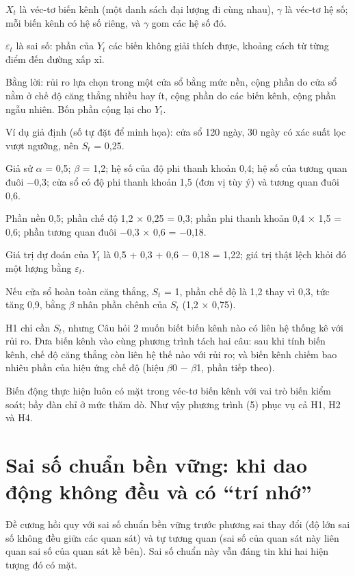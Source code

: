 \(X_{t}\) là véc-tơ biến kênh (một danh sách đại lượng đi cùng nhau), \(\gamma\) là véc-tơ hệ số; mỗi biến kênh có hệ số riêng, và \(\gamma\) gom các hệ số đó.

\(\varepsilon_{t}\) là sai số: phần của \(Y_{t}\) các biến không giải thích được, khoảng cách từ từng điểm đến đường xấp xỉ.

Bằng lời: rủi ro lựa chọn trong một cửa sổ bằng mức nền, cộng phần do cửa sổ nằm ở chế độ căng thẳng nhiều hay ít, cộng phần do các biến kênh, cộng phần ngẫu nhiên. Bốn phần cộng lại cho \(Y_{t}\).

\begin{tcolorbox}[breakable]
Ví dụ giả định (số tự đặt để minh họa): cửa sổ 120 ngày, 30 ngày có xác suất lọc vượt ngưỡng, nên \(S_{t}\) = 0,25.

Giả sử \(\alpha\) = 0,5; \(\beta\) = 1,2; hệ số của độ phi thanh khoản 0,4; hệ số của tương quan đuôi −0,3; cửa sổ có độ phi thanh khoản 1,5 (đơn vị tùy ý) và tương quan đuôi 0,6.

Phần nền 0,5; phần chế độ 1,2 × 0,25 = 0,3; phần phi thanh khoản 0,4 × 1,5 = 0,6; phần tương quan đuôi −0,3 × 0,6 = −0,18.

Giá trị dự đoán của \(Y_{t}\) là 0,5 + 0,3 + 0,6 − 0,18 = 1,22; giá trị thật lệch khỏi đó một lượng bằng \(\varepsilon_{t}\).

Nếu cửa sổ hoàn toàn căng thẳng, \(S_{t}\) = 1, phần chế độ là 1,2 thay vì 0,3, tức tăng 0,9, bằng \(\beta\) nhân phần chênh của \(S_{t}\) (1,2 × 0,75).
\end{tcolorbox}

H1 chỉ cần \(S_{t}\), nhưng Câu hỏi 2 muốn biết biến kênh nào có liên hệ thống kê với rủi ro. Đưa biến kênh vào cùng phương trình tách hai câu: sau khi tính biến kênh, chế độ căng thẳng còn liên hệ thế nào với rủi ro; và biến kênh chiếm bao nhiêu phần của hiệu ứng chế độ (hiệu \texorpdfstring{$\beta$}{beta}0 − \texorpdfstring{$\beta$}{beta}1, phần tiếp theo).

Biến động thực hiện luôn có mặt trong véc-tơ biến kênh với vai trò biến kiểm soát; bầy đàn chỉ ở mức thăm dò. Như vậy phương trình (5) phục vụ cả H1, H2 và H4.

\section{Sai số chuẩn bền vững: khi dao động không đều và có “trí nhớ”}

Đề cương hồi quy với sai số chuẩn bền vững trước phương sai thay đổi (độ lớn sai số không đều giữa các quan sát) và tự tương quan (sai số của quan sát này liên quan sai số của quan sát kề bên). Sai số chuẩn này vẫn đáng tin khi hai hiện tượng đó có mặt.

